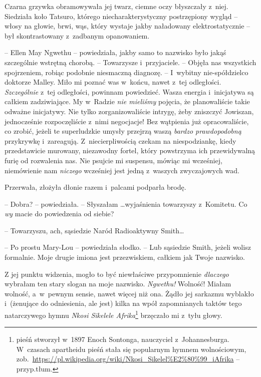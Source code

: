 \documentclass[oneside,polish,11pt,sfheadings]{mwbk}
\begin{document}
Czarna grzywka obramowywała jej twarz, ciemne oczy błyszczały z~niej.
Siedziała koło Tatsuro, którego niecharakterystyczny postrzępiony wygląd
-- włosy na głowie, brwi, wąs, który wystaje jakby naładowany
elektrostatycznie -- był skontrastowany z~zadbanym opanowaniem.

-- Ellen May Ngwethu -- powiedziała, jakby samo to nazwisko było jakąś
szczególnie wstrętną chorobą. -- Towarzysze i~przyjaciele. -- Objęła nas
wszystkich spojrzeniem, robiąc podobnie niesmaczną diagnozę. -- I~wybitny
nie-spółdzielco doktorze Malley. Miło mi poznać was w~końcu, nawet z~tej
odległości. \textit{Szczególnie} z~tej odległości, powinnam powiedzieć.
Wasza energia i~inicjatywa są całkiem zadziwiające. My w~Radzie
\textit{nie mieliśmy} pojęcia, że planowaliście takie odważne inicjatywy.
Nie tylko zorganizowaliście intrygę, żeby zniszczyć Jowiszan,
jednocześnie rozpoczęliście z~nimi negocjacje! Bez wątpienia już
opracowaliście, co zrobić, jeżeli te superludzkie umysły przejrzą waszą
\textit{bardzo prawdopodobną} przykrywkę i~zareagują. Z~niecierpliwością
czekam na niespodziankę, kiedy przedstawicie murowany, niezawodny
fortel, który powstrzyma ich przewidywalną furię od rozwalenia nas. Nie
psujcie mi suspensu, mówiąc mi wcześniej, niemówienie nam \textit{niczego}
wcześniej jest jedną z~waszych zwyczajowych wad.

Przerwała, złożyła dłonie razem i~palcami podparła brodę.

-- Dobra? -- powiedziała. -- Słyszałam \ldots  wyjaśnienia towarzyszy z~Komitetu. Co \textit{wy} macie do powiedzenia od siebie?

-- Towarzyszu, ach, sąsiedzie Naród Radioaktywny Smith\ldots 

-- Po prostu Mary-Lou -- powiedziała słodko. -- Lub sąsiedzie Smith, jeżeli
wolisz formalnie. Moje drugie imiona jest przezwiskiem, całkiem jak
Twoje nazwisko.

Z jej punktu widzenia, mogło to być niewłaściwe przypomnienie
\textit{dlaczego} wybrałam ten stary slogan na moje nazwisko.
\textit{Ngwethu!} Wolność! Miałam wolność, a~w~pewnym sensie, nawet więcej
niż ona. Żądło jej sarkazmu wyblakło i~(żenujące do odniesienia, ale
jest) kilka na wpół zapomnianych taktów tego natarczywego hymnu
\textit{Nkosi Sikelele Afrika}\footnote{ pieśń stworzył w~1897 Enoch Sontonga,
nauczyciel z~Johannesburga. W~czasach apartheidu pieśń stała się
popularnym hymnem wolnościowym,
zob.~\url{https://pl.wikipedia.org/wiki/Nkosi\_Sikelel\%E2\%80\%99\_iAfrika}
-- przyp.tłum.} brzęczało mi z~tyłu głowy.
\end{document}
